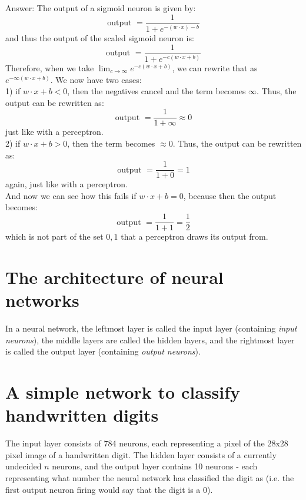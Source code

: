 \documentclass{article}
\begin{document}
\begin{enumerate}
Answer: The output of a sigmoid neuron is given by: \\
\begin{equation*}
\text{output } = \frac{1}{1 + e^{- (w \cdot x) - b}}
\end{equation*}
and thus the output of the scaled sigmoid neuron is:
\begin{equation*}
\text{output } = \frac{1}{1 + e^{-c(w \cdot x + b)}}
\end{equation*}
Therefore, when we take $\lim_{c \to \infty} e^{-c(w \cdot x + b)}$, we can rewrite that as $e^{-\infty (w \cdot x + b)}$. We now have two cases: \\
1) if $w \cdot x + b < 0$, then the negatives cancel and the term becomes $\infty$. Thus, the output can be rewritten as: 
\begin{equation*}
\text{output } = \frac{1}{1 + \infty} \approx 0
\end{equation*}
just like with a perceptron. \\
2) if $w \cdot x + b > 0$, then the term becomes $\approx 0$. Thus, the output can be rewritten as: 
\begin{equation*}
\text{output } = \frac{1}{1 + 0} = 1
\end{equation*}
again, just like with a perceptron. \\
And now we can see how this fails if $w \cdot x + b = 0$, because then the output becomes:
\begin{equation*}
\text{output } = \frac{1}{1 + 1} = \frac{1}{2}
\end{equation*}
which is not part of the set ${0, 1}$ that a perceptron draws its output from.
\end{enumerate}

\section{The architecture of neural networks}
In a neural network, the leftmost layer is called the input layer (containing \textit{input neurons}), the middle layers are called the hidden layers, and the rightmost layer is called the output layer (containing \textit{output neurons}).

\section{A simple network to classify handwritten digits}
The input layer consists of 784 neurons, each representing a pixel of the 28x28 pixel image of a handwritten digit. The hidden layer consists of a currently undecided $n$ neurons, and the output layer contains 10 neurons - each representing what number the neural network has classified the digit as (i.e. the first output neuron firing would say that the digit is a 0).
\end{document}
